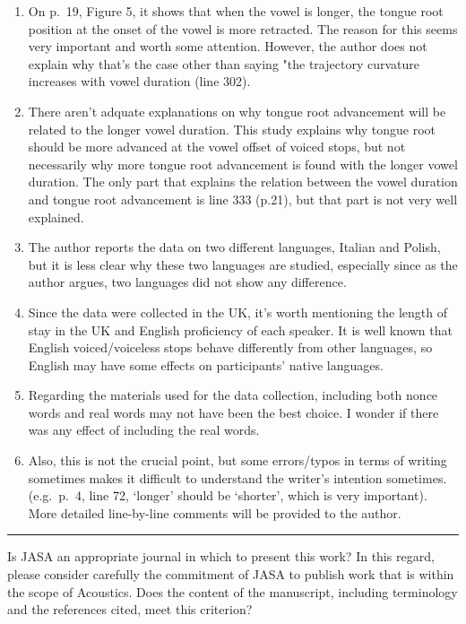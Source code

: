 \documentclass[]{article}
\begin{document}
\begin{enumerate}
\def\labelenumi{\arabic{enumi}.}
\setcounter{enumi}{1}
\item
  On p.~19, Figure 5, it shows that when the vowel is longer, the tongue
  root position at the onset of the vowel is more retracted. The reason
  for this seems very important and worth some attention. However, the
  author does not explain why that's the case other than saying "the
  trajectory curvature increases with vowel duration (line 302).
\item
  There aren't adquate explanations on why tongue root advancement will
  be related to the longer vowel duration. This study explains why
  tongue root should be more advanced at the vowel offset of voiced
  stops, but not necessarily why more tongue root advancement is found
  with the longer vowel duration. The only part that explains the
  relation between the vowel duration and tongue root advancement is
  line 333 (p.21), but that part is not very well explained.
\item
  The author reports the data on two different languages, Italian and
  Polish, but it is less clear why these two languages are studied,
  especially since as the author argues, two languages did not show any
  difference.
\item
  Since the data were collected in the UK, it's worth mentioning the
  length of stay in the UK and English proficiency of each speaker. It
  is well known that English voiced/voiceless stops behave differently
  from other languages, so English may have some effects on
  participants' native languages.
\item
  Regarding the materials used for the data collection, including both
  nonce words and real words may not have been the best choice. I wonder
  if there was any effect of including the real words.
\item
  Also, this is not the crucial point, but some errors/typos in terms of
  writing sometimes makes it difficult to understand the writer's
  intention sometimes. (e.g.~p.~4, line 72, `longer' should be
  `shorter', which is very important). More detailed line-by-line
  comments will be provided to the author.
\end{enumerate}

\par

\noindent

\rule{\textwidth}{0.4pt}

Is JASA an appropriate journal in which to present this work? In this
regard, please consider carefully the commitment of JASA to publish work
that is within the scope of Acoustics. Does the content of the
manuscript, including terminology and the references cited, meet this
criterion?
\end{document}
